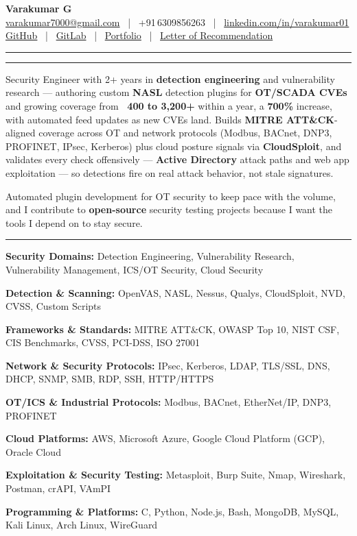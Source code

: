 \documentclass[9pt,a4paper]{extarticle}
\newcommand{\resumeSection}[1]{%
  \vspace{5pt}%
  \noindent{\large\bfseries\MakeUppercase{#1}}\par%
  \vspace{-7pt}%
  \noindent\rule{\textwidth}{0.5pt}%
  \par\vspace{0pt}%
}
\newcommand{\techrow}[2]{\noindent\textbf{#1} #2\par}
\begin{document}

\vspace*{-8pt}
\begin{center}
  {\LARGE\bfseries Varakumar G}\\[2pt]
  \href{mailto:varakumar7000@gmail.com}{varakumar7000@gmail.com}
  ~|~ +91\,6309856263
  ~|~ \href{https://www.linkedin.com/in/varakumar01}{linkedin.com/in/varakumar01}\\[1pt]
  \href{https://github.com/varakumar01}{GitHub}
  ~|~ \href{https://gitlab.com/Tony_01}{GitLab}
  ~|~ \href{https://portfolio.dragnux.com}{Portfolio}
  ~|~ \href{https://drive.google.com/file/d/17c5RtAgWn5TdRQUxnDIvLQogPoUoxgO_/view?pli=1}{Letter of Recommendation}
\end{center}
\vspace{-1pt}\noindent\rule{\textwidth}{0.7pt}

\resumeSection{Professional Summary}

Security Engineer with 2+ years in \textbf{detection engineering} and vulnerability research — authoring custom \textbf{NASL} detection plugins for \textbf{OT/SCADA CVEs} and growing coverage from \textbf{~400 to 3,200+} within a year, a \textbf{700\%} increase, with automated feed updates as new CVEs land. Builds \textbf{MITRE ATT\&CK}-aligned coverage across OT and network protocols (Modbus, BACnet, DNP3, PROFINET, IPsec, Kerberos) plus cloud posture signals via \textbf{CloudSploit}, and validates every check offensively — \textbf{Active Directory} attack paths and web app exploitation — so detections fire on real attack behavior, not stale signatures.

Automated plugin development for OT security to keep pace with the volume, and I contribute to \textbf{open-source} security testing projects because I want the tools I depend on to stay secure.

\resumeSection{Technical Skills}

\techrow{Security Domains:}{Detection Engineering, Vulnerability Research, Vulnerability Management, ICS/OT Security, Cloud Security}
\techrow{Detection \& Scanning:}{OpenVAS, NASL, Nessus, Qualys, CloudSploit, NVD, CVSS, Custom Scripts}
\techrow{Frameworks \& Standards:}{MITRE ATT\&CK, OWASP Top 10, NIST CSF, CIS Benchmarks, CVSS, PCI-DSS, ISO 27001}
\techrow{Network \& Security Protocols:}{IPsec, Kerberos, LDAP, TLS/SSL, DNS, DHCP, SNMP, SMB, RDP, SSH, HTTP/HTTPS}
\techrow{OT/ICS \& Industrial Protocols:}{Modbus, BACnet, EtherNet/IP, DNP3, PROFINET}
\techrow{Cloud Platforms:}{AWS, Microsoft Azure, Google Cloud Platform (GCP), Oracle Cloud}
\techrow{Exploitation \& Security Testing:}{Metasploit, Burp Suite, Nmap, Wireshark, Postman, crAPI, VAmPI}
\techrow{Programming \& Platforms:}{C, Python, Node.js, Bash, MongoDB, MySQL, Kali Linux, Arch Linux, WireGuard}
\end{document}
